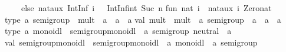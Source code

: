 \begin{isabellebody}
\begin{isamarkuptext}
\ \ \ \ else\ nat{}aux\ {}IntInf{}{}\ {}i{}\ {}{}\ {}\ IntInf{}int{}{}{}\ {}Suc\ n{}{}{}\isanewline
\isanewline
fun\ nat\ i\ {}\ nat{}aux\ i\ Zero{}nat{}\isanewline
\isanewline
type\ {}a\ semigroup\ {}\ {}mult\ {}\ {}a\ {}{}\ {}a\ {}{}\ {}a{}{}\isanewline
val\ mult\ {}\ {}mult\ {}\ {}a\ semigroup\ {}{}\ {}a\ {}{}\ {}a\ {}{}\ {}a{}\isanewline
\isanewline
type\ {}a\ monoidl\ {}\ {}semigroup{}monoidl\ {}\ {}a\ semigroup{}\ neutral\ {}\ {}a{}{}\isanewline
val\ semigroup{}monoidl\ {}\ {}semigroup{}monoidl\ {}\ {}a\ monoidl\ {}{}\ {}a\ semigroup{}\isanewline

\end{isamarkuptext}
\end{isabellebody}
